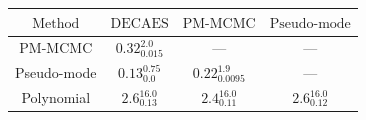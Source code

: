 \begin{tabular}{cccc}
  \toprule
  \textbf{$\text{Method}$} & \textbf{$\text{DECAES}$} & \textbf{$\text{PM-MCMC}$} & \textbf{$\text{Pseudo-mode}$} \\
  \midrule
  PM-MCMC                  & $0.32^{2.0}_{0.015}$     & ---                       & ---                           \\
  Pseudo-mode              & $0.13^{0.75}_{0.0}$      & $0.22^{1.9}_{0.0095}$     & ---                           \\
  Polynomial               & $2.6^{16.0}_{0.13}$      & $2.4^{16.0}_{0.11}$       & $2.6^{16.0}_{0.12}$           \\
  \bottomrule
\end{tabular}
